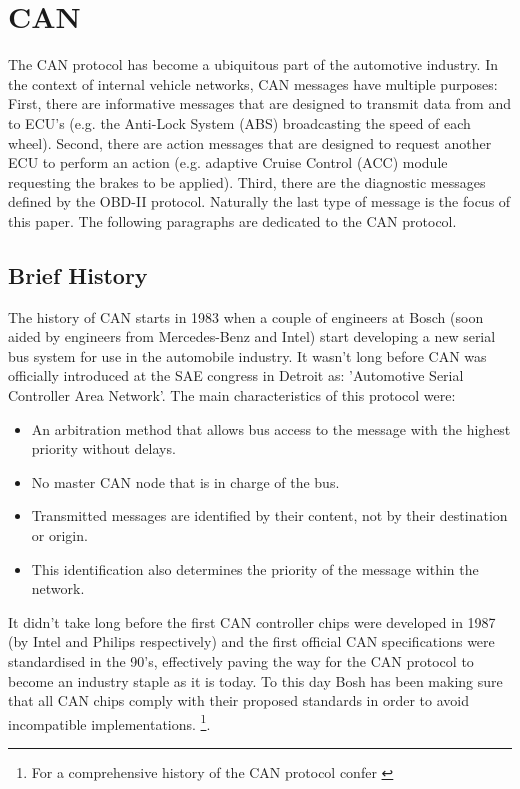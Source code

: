 \section{CAN}
\label{sec:can}

The CAN protocol has become a ubiquitous part of the automotive industry. In the context of internal vehicle networks, CAN messages have multiple purposes: First, there are informative messages that are designed to transmit data from and to ECU's (e.g. the Anti-Lock System (ABS) broadcasting the speed of each wheel). Second, there are action messages that are designed to request another ECU to perform an action (e.g. adaptive Cruise Control (ACC) module requesting the brakes to be applied). Third, there are the diagnostic messages defined by the OBD-II protocol. \cite{MillerB} Naturally the last type of message is the focus of this paper. The following paragraphs are dedicated to the CAN protocol.

\subsection{Brief History} 
\label{subsec:can:briefhistory}

The history of CAN starts in 1983 when a couple of engineers at Bosch (soon aided by engineers from Mercedes-Benz and Intel) start developing a new serial bus system for use in the automobile industry. It wasn't long before CAN was officially introduced at the SAE congress in Detroit as: 'Automotive Serial Controller Area Network'. The main characteristics of this protocol were: 

\begin{itemize}
	\item An arbitration method that allows bus access to the message with the highest priority without delays.
	\item No master CAN node that is in charge of the bus.
	\item Transmitted messages are identified by their content, not by their destination or origin.
	\item This identification also determines the priority of the message within the network.
\end{itemize}

It didn't take long before the first CAN controller chips were developed in 1987 (by Intel and Philips respectively) and the first official CAN specifications were standardised in the 90's, effectively paving the way for the CAN protocol to become an industry staple as it is today. To this day Bosh has been making sure that all CAN chips comply with their proposed standards in order to avoid incompatible implementations. \footnote{For a comprehensive history of the CAN protocol confer \cite{CANhistory}}.

